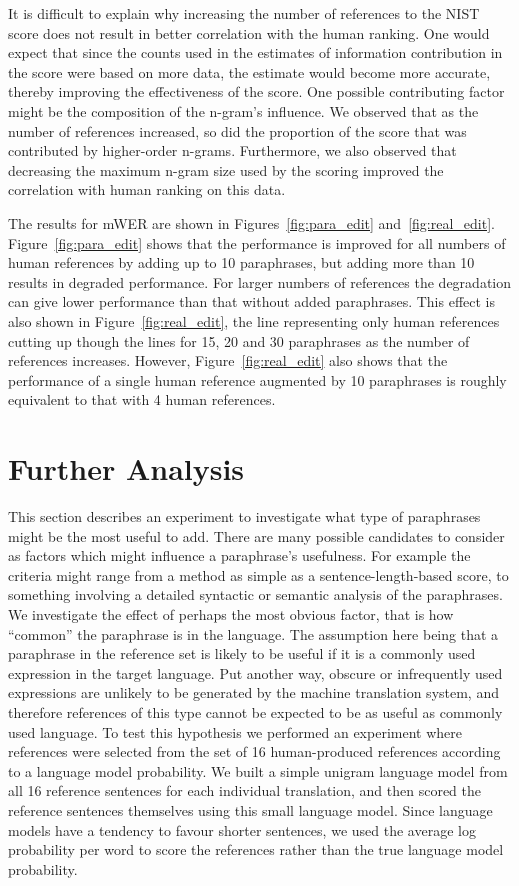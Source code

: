 It is difficult to explain why increasing the number of references to the NIST score does not result in better
correlation with the human ranking. One would expect that since the counts used in the estimates of information
contribution in the score were based on more data, the estimate would become more accurate, thereby improving
the effectiveness of the score. One possible contributing factor might be the composition of the n-gram's
influence. We observed that as the number of references increased, so did the proportion of the score that was
contributed by higher-order n-grams. Furthermore, we also observed that decreasing the maximum n-gram size used
by the scoring improved the correlation with human ranking on this data.

The results for mWER are shown in Figures~\ref{fig:para_edit} and~\ref{fig:real_edit}. 
Figure~\ref{fig:para_edit} shows that the performance is improved for all numbers of human references by adding
up to 10 paraphrases, but adding more than 10 results in degraded performance. For larger numbers of references
the degradation can give lower performance than that without added paraphrases. This effect is also shown in
Figure~\ref{fig:real_edit}, the line representing only human references cutting up though the lines for 15, 20
and 30 paraphrases as the number of references increases. However, Figure~\ref{fig:real_edit} also shows that
the performance of a single human reference augmented by 10 paraphrases is roughly equivalent to that with 4
human references.

\section{Further Analysis}
\label{sec:application:analysis}

This section describes an experiment to investigate what type of paraphrases might be the most useful to add.
There are many possible candidates to consider as factors which might influence a paraphrase's usefulness. For
example the criteria might  range from a method as simple as a sentence-length-based score, to something
involving a detailed syntactic or semantic analysis of the paraphrases. We investigate the effect of perhaps the
most obvious factor, that is how ``common'' the paraphrase is in the language. The assumption here being that a
paraphrase in the reference set is likely to be useful if it is a commonly used expression in the target
language. Put another way, obscure or infrequently used expressions are unlikely to be generated by the machine
translation system, and therefore references of this type cannot be expected to be as useful as commonly used
language. To test this hypothesis we performed an experiment where references were selected from the set of 16
human-produced references according to a language model probability. We built a simple unigram language model
from all 16 reference sentences for each individual translation, and then scored the reference sentences
themselves using this small language model. Since language models have a tendency to favour shorter sentences,
we used the average log probability per word to score the references rather than the true language model
probability. 

